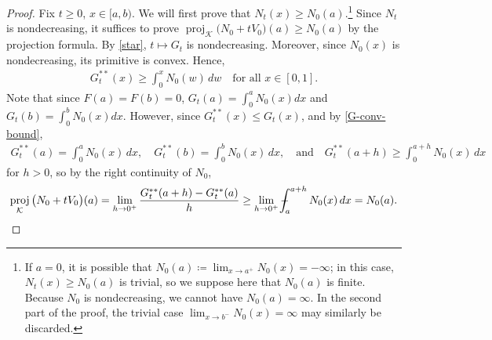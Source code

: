 \documentclass[11pt]{article}
\numberwithin{equation}{section}
\def\Xint#1{\mathchoice
{\XXint\displaystyle\textstyle{#1}}%
{\XXint\textstyle\scriptstyle{#1}}%
{\XXint\scriptstyle\scriptscriptstyle{#1}}%
{\XXint\scriptscriptstyle\scriptscriptstyle{#1}}%
   \!\int}
\def\XXint#1#2#3{{\setbox0=\hbox{$#1{#2#3}{\int}$}
\vcenter{\hbox{$#2#3$}}\kern-.5\wd0}}
\def\dashint{\Xint-}
\DeclareMathOperator{\proj}{proj}
\begin{document}
\begin{proof}
Fix $t\geq0$, $x\in[a,b)$. We will first prove that $N_t(x)\geq N_0(a)$.\footnote{If $a=0$, it is possible that $N_0(a)\coloneq\lim_{x\to a^+}N_0(x)=-\infty$; in this case, $N_t(x)\geq N_0(a)$ is trivial, so we suppose here that $N_0(a)$ is finite. Because $N_0$ is nondecreasing, we cannot have $N_0(a)=\infty$. In the second part of the proof, the trivial case $\lim_{x\to b^-}N_0(x)=\infty$ may similarly be discarded.} Since $N_t$ is nondecreasing, it suffices to prove $\proj_\mathcal{K}\big(N_0+tV_0\big)(a)\geq N_0(a)$ by the projection formula. By \eqref{star}, $t\mapsto G_t$ is nondecreasing. Moreover, since $N_0(x)$ is nondecreasing, its primitive is convex. Hence, 
\begin{align}\label{G-conv-bound}
    G^{**}_t(x)\geq\int_0^x N_0(w) \, dw \quad \text{for all } x\in[0,1].
\end{align}
Note that since $F(a)=F(b)=0$, $G_t(a)=\int_0^a N_0(x)dx$ and $G_t(b)=\int_0^b N_0(x)dx$.
However, since $G_t^{**}(x)\leq G_t(x)$, and by \eqref{G-conv-bound},
\begin{align}\label{G-conv-endpoints}
    G_t^{**}(a)=\int_0^a N_0(x) \, dx, \quad  G_t^{**}(b)=\int_0^b N_0(x) \, dx, \quad \text{and} \quad G_t^{**}(a+h)\geq \int_0^{a+h} N_0(x) \, dx
\end{align}
for $h>0$, so by the right continuity of $N_0$,
\begin{align*}
    \proj_\mathcal{K}\big(N_0+tV_0\big)(a)=\lim_{h\to 0^+}\frac{G_t^{**}(a+h)-G_t^{**}(a)}{h}\geq\lim_{h\to 0^+}\dashint_a^{a+h} N_0(x) \, dx=N_0(a).
\end{align*}


\end{proof}
\end{document}
